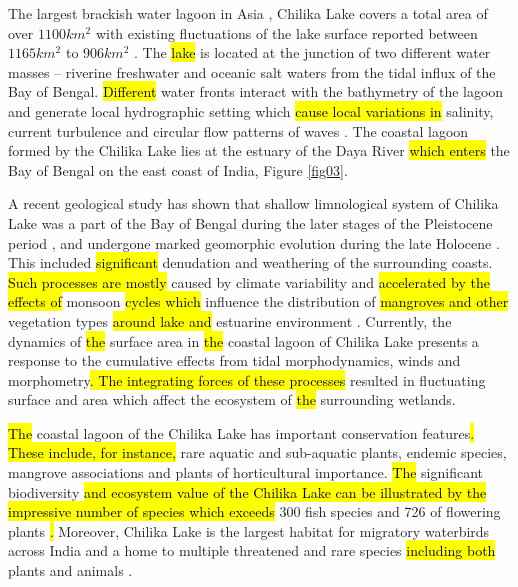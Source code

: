 \documentclass[jmse,article,submit,pdftex,moreauthors]{Definitions/mdpi}
\begin{document}
The largest brackish water lagoon in Asia \cite{BEHERA2020101328,BARIK201739}, Chilika Lake covers a total area of over $1100 km^2$ with existing fluctuations of the lake surface reported between $1165 km^2$ to $906 km^2$ \cite{Behera2023}. The \hl{lake} is located at the junction of two different water masses -- riverine freshwater and oceanic salt waters from the tidal influx of the Bay of Bengal. \hl{Different} water fronts interact with the bathymetry of the lagoon and generate local hydrographic setting which \hl{cause local variations in} salinity, current turbulence and circular flow patterns of waves \cite{Nazneen}. The coastal lagoon formed by the Chilika Lake lies\hl{ }at the estuary of the Daya River \hl{which enters}  the Bay of Bengal on the east coast of India, Figure \ref{fig03}. 

A recent geological study has shown that\hl{ }shallow limnological system of Chilika Lake was a part of the Bay of Bengal during the later stages of the Pleistocene period \cite{BOROLE1993761}, and undergone marked geomorphic evolution during the late Holocene \cite{MISHRA2022457,AMIR2021148}. This included \hl{significant }denudation and weathering of the surrounding coasts.\hl{ Such processes are mostly} caused by climate variability and \hl{accelerated by the effects of }monsoon \hl{cycles which} influence the distribution of \hl{mangroves and other }vegetation types \hl{around lake and} estuarine environment \cite{DASH2023106754}. Currently, the dynamics of \hl{the }surface area in \hl{the }coastal lagoon of Chilika Lake presents a response to the cumulative effects from tidal morphodynamics, winds and morphometry\hl{. The integrating forces of these processes} resulted in fluctuating surface and area which\hl{ }affect the ecosystem of \hl{the }surrounding wetlands.

\hl{The }coastal lagoon of the Chilika Lake has important conservation features\hl{. These include, for instance, }rare aquatic and sub-aquatic plants,\hl{ }endemic species, mangrove associations and plants of horticultural importance. \hl{The }significant biodiversity \hl{and ecosystem value of the Chilika Lake can be illustrated by the impressive number of species which exceeds} 300 fish species \cite{MOHAPATRA2015195} and 726 of flowering plants \cite{Sarkar2012}\hl{. }Moreover, Chilika Lake is the largest habitat for migratory waterbirds across India and a home to multiple threatened and rare species \hl{including both} plants and animals \cite{Balachandran2020}. 
\end{document}
